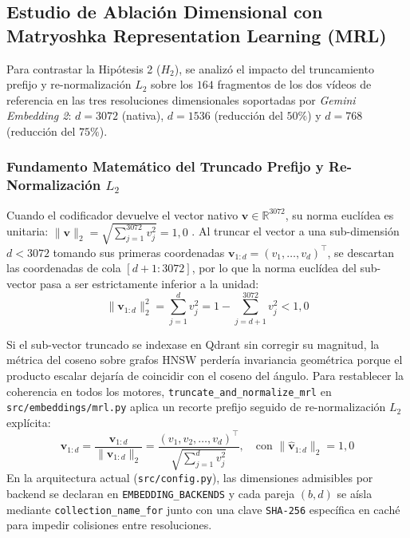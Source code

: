 \subsection{Estudio de Ablación Dimensional con Matryoshka Representation Learning (MRL)}
\label{subsec:ablacion_dimensional_mrl}

Para contrastar la Hipótesis 2 ($H_2$), se analizó el impacto del truncamiento prefijo y re-normalización $L_2$ sobre los $164$ fragmentos de los dos vídeos de referencia en las tres resoluciones dimensionales soportadas por \textit{Gemini Embedding 2}: $d = 3072$ (nativa), $d = 1536$ (reducción del $50\%$) y $d = 768$ (reducción del $75\%$).

\subsubsection{Fundamento Matemático del Truncado Prefijo y Re-Normalización $L_2$}
Cuando el codificador devuelve el vector nativo $\mathbf{v} \in \mathbb{R}^{3072}$, su norma euclídea es unitaria: $\|\mathbf{v}\|_2 = \sqrt{\sum_{j=1}^{3072} v_j^2} = 1,0$ \cite{gemini_emb2_docs}. Al truncar el vector a una sub-dimensión $d < 3072$ tomando sus primeras coordenadas $\mathbf{v}_{1:d} = (v_1, \dots, v_d)^\top$, se descartan las coordenadas de cola $[d+1 : 3072]$, por lo que la norma euclídea del sub-vector pasa a ser estrictamente inferior a la unidad:
\begin{equation}
    \|\mathbf{v}_{1:d}\|_2^2 = \sum_{j=1}^{d} v_j^2 = 1 - \sum_{j=d+1}^{3072} v_j^2 < 1,0
    \label{eq:perdida_norma_mrl}
\end{equation}

Si el sub-vector truncado se indexase en Qdrant sin corregir su magnitud, la métrica del coseno sobre grafos HNSW \cite{malkov2020hnsw} perdería invariancia geométrica porque el producto escalar dejaría de coincidir con el coseno del ángulo. Para restablecer la coherencia en todos los motores, \texttt{truncate\_and\_normalize\_mrl} en \texttt{src/embeddings/mrl.py} aplica un recorte prefijo seguido de re-normalización $L_2$ explícita:
\begin{equation}
    \hat{\mathbf{v}}_{1:d} = \frac{\mathbf{v}_{1:d}}{\|\mathbf{v}_{1:d}\|_2} = \frac{(v_1, v_2, \dots, v_d)^\top}{\sqrt{\sum_{j=1}^{d} v_j^2}}, \quad \text{con } \|\hat{\mathbf{v}}_{1:d}\|_2 = 1,0
    \label{eq:formula_mrl_l2_tex}
\end{equation}
En la arquitectura actual (\texttt{src/config.py}), las dimensiones admisibles por backend se declaran en \texttt{EMBEDDING\_\allowbreak BACKENDS} y cada pareja $(b, d)$ se aísla mediante \texttt{collection\_name\_for} junto con una clave \texttt{SHA-256} específica en caché para impedir colisiones entre resoluciones.

